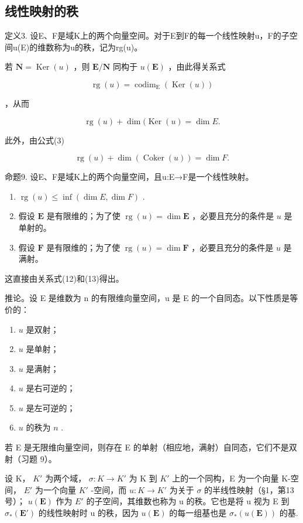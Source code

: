 \subsection{线性映射的秩}

定义3. 设E、F是域K上的两个向量空间。对于E到F的每一个线性映射u，F的子空间u(E)的维数称为u的秩，记为rg(u)。

若 \(\mathbf{N} = \operatorname{Ker}(u)\) ，则 \(\mathbf{E} / \mathbf{N}\) 同构于 \(u(\mathbf{E})\) ，由此得关系式

\[
\operatorname{rg} (u) = \operatorname{codim} _ {\mathrm{E}} (\operatorname{Ker} (u))\tag{11}
\]

，从而

\[
\operatorname{rg} (u) + \dim (\operatorname{Ker} (u) = \dim E.\tag{12}
\]

此外，由公式(3)

\[
\operatorname{rg} (u) + \dim (\operatorname{Coker} (u)) = \dim F.\tag{13}
\]

命题9. 设E、F是域K上的两个向量空间，且u:E→F是一个线性映射。

\begin{enumerate}
\def\labelenumi{(\roman{enumi})}
\item
  \(\operatorname{rg}(u) \leqslant \inf(\dim E, \dim F)\) .
\item
  假设 \(\mathbf{E}\) 是有限维的；为了使 \(\operatorname{rg}(u) = \dim \mathbf{E}\) ，必要且充分的条件是 \(u\) 是单射的。
\item
  假设 \(\mathbf{F}\) 是有限维的；为了使 \(\operatorname{rg}(u) = \dim \mathbf{F}\) ，必要且充分的条件是 \(u\) 是满射。
\end{enumerate}

这直接由关系式(12)和(13)得出。

推论。设 E 是维数为 n 的有限维向量空间，u 是 E 的一个自同态。以下性质是等价的：

\begin{enumerate}
\def\labelenumi{(\alph{enumi})}
\item
  \(u\) 是双射；
\item
  \(u\) 是单射；
\item
  \(u\) 是满射；
\item
  \(u\) 是右可逆的；
\item
  \(u\) 是左可逆的；
\item
  \(u\) 的秩为 \(n\) .
\end{enumerate}

若 E 是无限维向量空间，则存在 E 的单射（相应地，满射）自同态，它们不是双射（习题 9）。

设 K， \(K'\) 为两个域， \(\sigma:K\to K'\) 为 K 到 \(K'\) 上的一个同构，E 为一个向量 K-空间， \(E'\) 为一个向量 \(K'\) -空间，而 \(u:K\to K'\) 为关于 \(\sigma\) 的半线性映射（§1，第13号）； \(u(\mathbf{E})\) 作为 \(E'\) 的子空间，其维数也称为 u 的秩。它也是将 u 视为 E 到 \(\sigma_{*}(\mathbf{E}')\) 的线性映射时 u 的秩，因为 \(u(\mathbf{E})\) 的每一组基也是 \(\sigma_{*}(u(\mathbf{E}))\) 的基.

